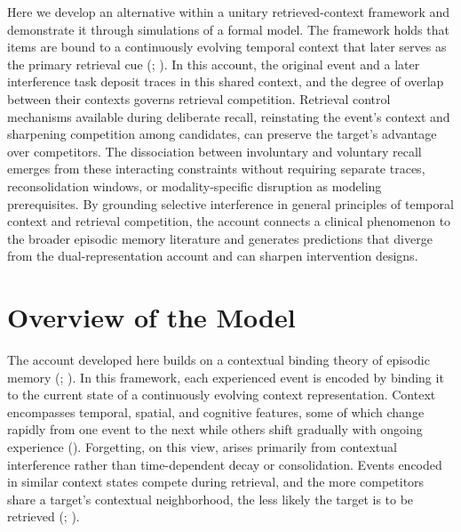 \documentclass[
  man,
  floatsintext,
  longtable,
  nolmodern,
  notxfonts,
  notimes,
  draftfirst,
  colorlinks=true,linkcolor=blue,citecolor=blue,urlcolor=blue]{apa7}
\begin{document}
Here we develop an alternative within a unitary retrieved-context
framework and demonstrate it through simulations of a formal model. The
framework holds that items are bound to a continuously evolving temporal
context that later serves as the primary retrieval cue
(;
). In this account,
the original event and a later interference task deposit traces in this
shared context, and the degree of overlap between their contexts governs
retrieval competition. Retrieval control mechanisms available during
deliberate recall, reinstating the event's context and sharpening
competition among candidates, can preserve the target's advantage over
competitors. The dissociation between involuntary and voluntary recall
emerges from these interacting constraints without requiring separate
traces, reconsolidation windows, or modality-specific disruption as
modeling prerequisites. By grounding selective interference in general
principles of temporal context and retrieval competition, the account
connects a clinical phenomenon to the broader episodic memory literature
and generates predictions that diverge from the dual-representation
account and can sharpen intervention designs.

\section{Overview of the Model}\label{overview-of-the-model}

The account developed here builds on a contextual binding theory of
episodic memory (; ).
In this framework, each experienced event is encoded by binding it to
the current state of a continuously evolving context representation.
Context encompasses temporal, spatial, and cognitive features, some of
which change rapidly from one event to the next while others shift
gradually with ongoing experience
().
Forgetting, on this view, arises primarily from contextual interference
rather than time-dependent decay or consolidation. Events encoded in
similar context states compete during retrieval, and the more
competitors share a target's contextual neighborhood, the less likely
the target is to be retrieved (; ).
\end{document}
